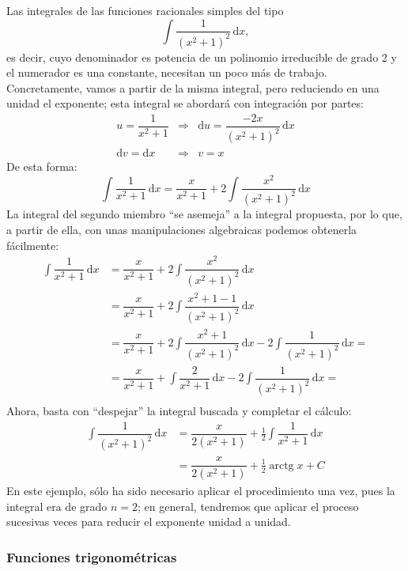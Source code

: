 \begin{ejemplo}\label{4racred}
Las integrales de las funciones racionales simples del tipo
\[
\displaystyle\int\dfrac{1}{(x^2+1)^2}\,\mathrm dx,
\]
es decir, cuyo denominador es potencia de un polinomio irreducible de grado 2 y el numerador es una constante, necesitan un poco más de trabajo.
Concretamente, vamos a partir de la misma integral, pero reduciendo en una unidad el exponente;
esta integral se abordará con integración por partes:
\begin{eqnarray*}
u=\dfrac{1}{x^2+1}	& \Longrightarrow & \mathrm du=\dfrac{-2x}{(x^2+1)^2}\,\mathrm dx			\\
\mathrm dv=\mathrm dx				& \Longrightarrow & v=x
\end{eqnarray*}
De esta forma:
\[
\displaystyle\int\dfrac{1}{x^2+1}\,\mathrm dx = \dfrac{x}{x^2+1}+2\displaystyle\int\dfrac{x^2}{(x^2+1)^2}\,\mathrm dx
\]
La integral del segundo miembro ``se asemeja'' a la integral propuesta, por lo que, a partir de ella, con unas manipulaciones algebraicas podemos obtenerla fácilmente:
\begin{align*}
\displaystyle\int\dfrac{1}{x^2+1}\,\mathrm dx
& = \dfrac{x}{x^2+1}+2\displaystyle\int\dfrac{x^2}{(x^2+1)^2}\,\mathrm dx \\
& = \dfrac{x}{x^2+1}+ 2\displaystyle\int\dfrac{x^2+1-1}{(x^2+1)^2}\,\mathrm dx \\
& = \dfrac{x}{x^2+1}+ 2\displaystyle\int\dfrac{x^2+1}{(x^2+1)^2}\,\mathrm dx -2\displaystyle\int\dfrac{1}{(x^2+1)^2}\,\mathrm dx = \\
& = \dfrac{x}{x^2+1}+ \displaystyle\int\dfrac{2}{x^2+1}\,\mathrm dx -2\displaystyle\int\dfrac{1}{(x^2+1)^2}\,\mathrm dx = \\
\end{align*}
Ahora, basta con ``despejar'' la integral buscada y completar el cálculo:
\begin{align*}
\displaystyle\int\dfrac{1}{(x^2+1)^2}\,\mathrm dx & = 
\dfrac{x}{2(x^2+1)}+ \frac12\displaystyle\int\dfrac{1}{x^2+1}\,\mathrm dx\\
& = 
\dfrac{x}{2(x^2+1)}+ \frac12\operatorname{arctg} x +C
\end{align*}
%
En este ejemplo, sólo ha sido necesario aplicar el procedimiento una vez, pues la integral era de grado $n=2$;
en general, tendremos que aplicar el proceso sucesivas veces para reducir el exponente unidad a unidad.\fej
\end{ejemplo}

\subsubsection{Funciones trigonométricas}\label{trig}

